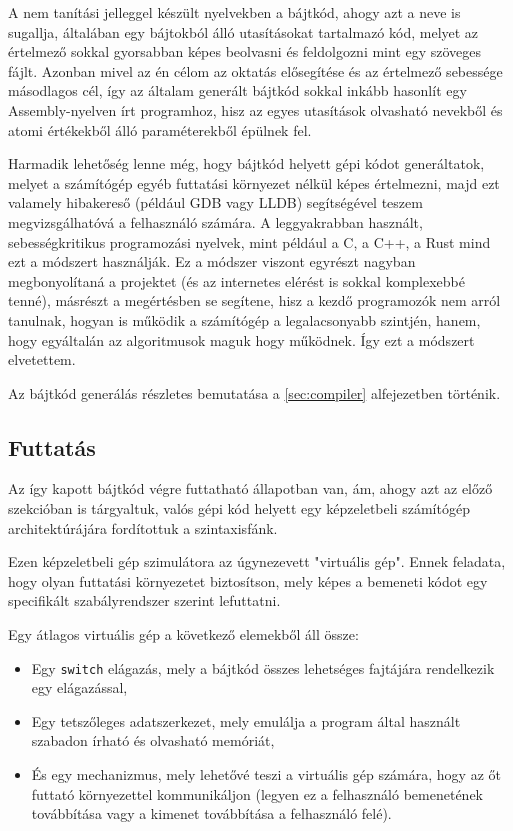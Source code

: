 A nem tanítási jelleggel készült nyelvekben a bájtkód, ahogy azt a neve is sugallja, általában egy bájtokból álló utasításokat tartalmazó kód, melyet az értelmező sokkal gyorsabban képes beolvasni és feldolgozni mint egy szöveges fájlt. Azonban mivel az én célom az oktatás elősegítése és az értelmező sebessége másodlagos cél, így az általam generált bájtkód sokkal inkább hasonlít egy Assembly-nyelven írt programhoz, hisz az egyes utasítások olvasható nevekből és atomi értékekből álló paraméterekből épülnek fel. 

Harmadik lehetőség lenne még, hogy bájtkód helyett gépi kódot generáltatok, melyet a számítógép egyéb futtatási környezet nélkül képes értelmezni, majd ezt valamely hibakereső (például GDB vagy LLDB) segítségével teszem megvizsgálhatóvá a felhasználó számára. A leggyakrabban használt, sebességkritikus programozási nyelvek, mint például a C, a C++, a Rust mind ezt a módszert használják. Ez a módszer viszont egyrészt nagyban megbonyolítaná a projektet (és az internetes elérést is sokkal komplexebbé tenné), másrészt a megértésben se segítene, hisz a kezdő programozók nem arról tanulnak, hogyan is működik a számítógép a legalacsonyabb szintjén, hanem, hogy egyáltalán az algoritmusok maguk hogy működnek. Így ezt a módszert elvetettem.

Az bájtkód generálás részletes bemutatása a \ref{sec:compiler} alfejezetben történik.

\subsection{Futtatás}

Az így kapott bájtkód végre futtatható állapotban van, ám, ahogy azt az előző szekcióban is tárgyaltuk, valós gépi kód helyett egy képzeletbeli számítógép architektúrájára fordítottuk a szintaxisfánk.

Ezen képzeletbeli gép szimulátora az úgynezevett "virtuális gép". Ennek feladata, hogy olyan futtatási környezetet biztosítson, mely képes a bemeneti kódot egy specifikált szabályrendszer szerint lefuttatni.

Egy átlagos virtuális gép a következő elemekből áll össze:

\begin{itemize}
    \item Egy \texttt{switch} elágazás, mely a bájtkód összes lehetséges fajtájára rendelkezik egy elágazással,
    \item Egy tetszőleges adatszerkezet, mely emulálja a program által használt szabadon írható és olvasható memóriát,
    \item És egy mechanizmus, mely lehetővé teszi a virtuális gép számára, hogy az őt futtató környezettel kommunikáljon (legyen ez a felhasználó bemenetének továbbítása vagy a kimenet továbbítása a felhasználó felé).
\end{itemize}

